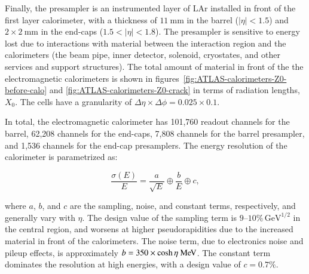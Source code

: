 Finally, the presampler is an instrumented layer of LAr installed in front of the first layer calorimeter, with a thickness of $\SI{11}{\milli\meter}$ in the barrel ($|\eta|<1.5$) and $2\times \SI{2}{\milli\meter}$ in the end-caps ($1.5<|\eta|<1.8$). The presampler is sensitive to energy lost due to interactions with material between the interaction region and the calorimeters (the beam pipe, inner detector, solenoid, cryostates, and other services and support structures). The total amount of material in front of the the electromagnetic calorimeters is shown in figures~\ref{fig:ATLAS-calorimeters-Z0-before-calo} and \ref{fig:ATLAS-calorimeters-Z0-crack} in terms of radiation lengths, $X_0$. The cells have a granularity of $\Delta\eta\times\Delta\phi=0.025\times0.1$. 

In total, the electromagnetic calorimeter has 101,760 readout channels for the barrel, 62,208 channels for the end-caps, 7,808 channels for the barrel presampler, and 1,536 channels for the end-cap presamplers. The energy resolution of the calorimeter is parametrized as:

\begin{equation}\label{eqn:experiment-LAr-resolution}
	\frac{\sigma(E)}{E} = \frac{a}{\sqrt{E}} \oplus \frac{b}{E} \oplus c,
\end{equation}

where $a$, $b$, and $c$ are the sampling, noise, and constant terms, respectively, and generally vary with $\eta$. The design value of the sampling term is $9\mbox{--}10\%\,\mbox{GeV}^{1/2}$ in the central region, and worsens at higher pseudorapidities due to the increased material in front of the calorimeters. The noise term, due to electronics noise and pileup effects, is approximately $b = 350 \times \cosh\eta \MeV$. The constant term dominates the resolution at high energies, with a design value of $c=0.7\%$. 


